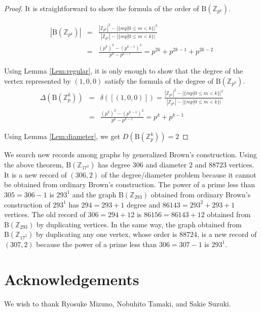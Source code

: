 \documentclass{article}
\newcommand{\Z}{\mathbb Z}
\newcommand{\B}{\mathrm{B}}
\begin{document}
\begin{proof}
It is straightforward to show the formula of the order of $\B(\Z_{p^k})$.

\begin{eqnarray*}
|\B(\Z_{p^k})| & = & \frac{|\Z_{p^k}|^3 - |\{ mp | 0 \leq m < k \}|^3}{|\Z_{p^k}|-|\{ mp | 0 \leq m < k \}|} \\ 
& = & \frac{(p^k)^3 - (p^{k-1})^3}{p^k-p^{k-1}} = p^{2k}+p^{2k-1}+p^{2k-2}
\end{eqnarray*}

Using Lemma \ref{Lem:regular}, it is only enough to show that the degree of the vertex represented by $(1,0,0)$ satisfy the formula of the degree of $\B(\Z_{p^k})$. 
\begin{eqnarray*}
\Delta(\B(\Z_p^k)) & = & \delta([(1,0,0)]) = \frac{|\Z_{p^k}|^2 - |\{ mp | 0 \leq m < k \}|^2 }{|\Z_{p^k}|-|\{ mp | 0 \leq m < k \}|} \\
& = & \frac{(p^k)^2 - (p^{k-1})^2}{p^k-p^{k-1}} = p^k + p^{k-1}
\end{eqnarray*}

Using Lemma \ref{Lem:diameter}, we get $D(\B(\Z_p^k)) = 2$

\end{proof}

We search new records among graphs by generalized Brown's construction.
Using the above theorem, $\B(\Z_{17^2})$ has degree $306$ and diameter $2$ and $88723$ vertices.
It is a new record of $(306,2)$ of the degree/diameter problem because it cannot be obtained from ordinary Brown's construction.
The power of a prime less than $305=306 - 1$ is $293^1$ and the graph $\B(\Z_{293})$ obtained from ordinary Brown's construction of $293^1$ has $294=293+1$ degree and $86143=293^2+293+1$ vertices.
The old record of $306=294+12$ is $86156=86143+12$ obtained from $\B(\Z_{293})$ by duplicating vertices.
In the same way, the graph obtained from $\B(\Z_{17^2})$ by duplicating any one vertex, whose order is $88724$, is a new record of $(307,2)$ because the power of a prime less than $306=307-1$ is $293^1$.

\section{Acknowledgements}
We wish to thank Ryosuke Mizuno, Nobuhito Tamaki, and Sakie Suzuki.



\end{document}
